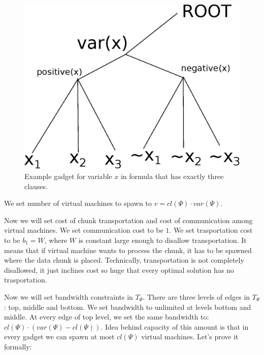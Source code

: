 \begin{figure}[htbp]
\includegraphics[width = \columnwidth]{figs/gadget-no-bw.eps}
\caption{Example gadget for variable $x$ in formula that has exactly
three clauses.}
\label{fig:gadgets}
\end{figure}

We set number of virtual machines to spawn to $v = cl(\Psi) \cdot var(\Psi)$.

Now we will set cost of chunk transportation and cost of communication
among virtual machines. We set communication cost to be $1$. We set
trasportation cost to be $b_1 = W$, where $W$ is constant large enough
to disallow transportation. It means that if virtual machine wants to
process the chunk, it has to be spawned where the data chunk is
placed. Technically, transportation is not completely disallowed, it
just inclines cost so huge that every optimal solution has no
trasportation.

Now we will set bandwidth constraints in $T_{\Psi}$. There are three
levels of edges in $T_{\Psi}$: top, middle and bottom. We set
bandwidth to unlimited at levels bottom and middle. At every edge of
top level, we set the same bandwidth to: $cl(\Psi) \cdot (var(\Psi) -
cl(\Psi))$. Idea behind capacity of this amount is that in every gadget we can
spawn at most $cl(\Psi)$ virtual machines. Let's prove it formally:

